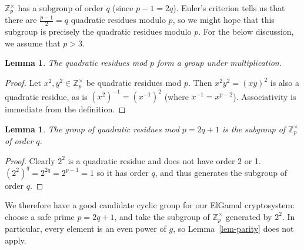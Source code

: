 \documentclass[12pt,a4paper]{article}
\newtheorem{lemma}[theorem]{Lemma}
\theoremstyle{definition}
\begin{document}
$\mathbb{Z}^\times_p$ has a subgroup of order $q$ (since $p-1=2q$). Euler's criterion tells us that there are $\frac{p-1}{2}=q$ quadratic residues modulo $p$, so we might hope that this subgroup is precisely the quadratic residues modulo $p$. For the below discussion, we assume that $p>3$.
\begin{lemma}
    The quadratic residues mod $p$ form a group under multiplication.
\end{lemma}
\begin{proof}
    Let $x^2,y^2\in\mathbb{Z}^\times_p$ be quadratic residues mod $p$. Then $x^2y^2=(xy)^2$ is also a quadratic residue, as is $(x^2)^{-1}=(x^{-1})^2$ (where $x^{-1}=x^{p-2}$). Associativity is immediate from the definition.
\end{proof}
\begin{lemma}
    The group of quadratic residues mod $p=2q+1$ is the subgroup of $\mathbb{Z}^\times_p$ of order $q$.
\end{lemma}
\begin{proof}
    Clearly $2^2$ is a quadratic residue and does not have order 2 or 1. $(2^2)^q=2^{2q}=2^{p-1}=1$ so it has order $q$, and thus generates the subgroup of order $q$.
\end{proof}

We therefore have a good candidate cyclic group for our ElGamal cryptosystem: choose a safe prime $p=2q+1$, and take the subgroup of $\mathbb{Z}^\times_p$ generated by $2^2$. In particular, every element is an even power of $g$, so Lemma~\ref{lem-parity} does not apply.
\end{document}
